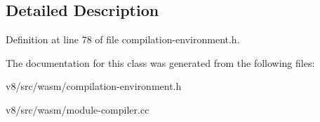 \subsection{Detailed Description}


Definition at line 78 of file compilation-\/environment.\+h.



The documentation for this class was generated from the following files\+:\begin{DoxyCompactItemize}
\item 
v8/src/wasm/compilation-\/environment.\+h\item 
v8/src/wasm/module-\/compiler.\+cc\end{DoxyCompactItemize}
